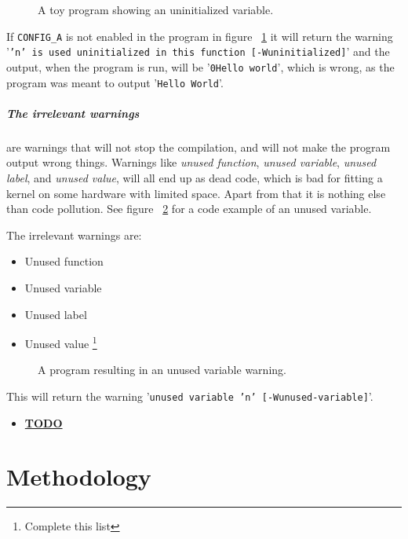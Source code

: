 \documentclass[a4paper,11pt]{report}
\newcommand{\textcode}[1]{
    \fboxsep=1pt
    \texttt{\colorbox{gray!20}{#1}}
}
\newcommand{\figa}{
    \begin{figure}[!htpb]
    \centering
}
\newcommand{\figb}[2]{
    \caption{#1}
    \label{#2}
    \end{figure}
}
\begin{document}
\figa
    
\figb{A toy program showing an uninitialized variable.}{lst:uninitvar}

If \textcode{CONFIG\_A} is not enabled in the program in figure 
~\ref{lst:uninitvar} it will return the warning 
'\texttt{'n' is used uninitialized in this function [-Wuninitialized]}' and the 
output, when the program is run, will be '\texttt{0Hello world}',
which is wrong, as the program was meant to output '\texttt{Hello World}'.

    \paragraph{The irrelevant warnings}
are warnings that will not stop the compilation, and will not make the program 
output wrong things. Warnings like \emph{unused function}, \emph{unused 
variable}, \emph{unused label}, and \emph{unused value}, will all end up as 
dead code, which is bad for fitting a kernel on some hardware with limited 
space. Apart from that it is nothing else than code pollution. See figure 
~\ref{lst:unusedvar} for a code example  of an unused variable.

The irrelevant warnings are:

\begin{itemize}
    \item Unused function
    \item Unused variable
    \item Unused label
    \item Unused value
        \footnote{Complete this list}
\end{itemize}

\figa
    
\figb{A program resulting in an unused variable warning.}{lst:unusedvar}

This will return the warning '\texttt{unused variable 'n' [-Wunused-variable]}'.

\begin{itemize}
    \item \underline{\textbf{TODO}}
\end{itemize}


\newpage
\chapter{Methodology}
\end{document}

